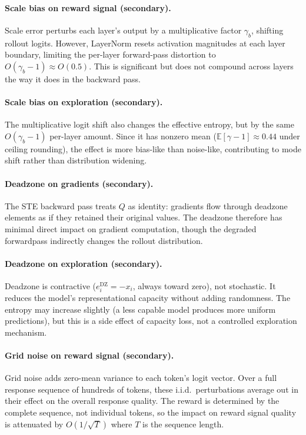 \documentclass{article}
\theoremstyle{definition}
\theoremstyle{remark}
\newcommand{\Expect}{\mathbb{E}}
\begin{document}
\paragraph{Scale bias on reward signal (secondary).}
Scale error perturbs each layer's output by a multiplicative factor $\gamma_b$, shifting rollout logits. However, LayerNorm resets activation magnitudes at each layer boundary, limiting the per-layer forward-pass distortion to $O(\gamma_b {-} 1) \approx O(0.5)$. This is significant but does not compound across layers the way it does in the backward pass.

\paragraph{Scale bias on exploration (secondary).}
The multiplicative logit shift also changes the effective entropy, but by the same $O(\gamma_b{-}1)$ per-layer amount. Since it has nonzero mean ($\Expect[\gamma{-}1] \approx 0.44$ under ceiling rounding), the effect is more bias-like than noise-like, contributing to mode shift rather than distribution widening.

\paragraph{Deadzone on gradients (secondary).}
The STE backward pass treats $Q$ as identity: gradients flow through deadzone elements as if they retained their original values. The deadzone therefore has minimal direct impact on gradient computation, though the degraded forwardpass indirectly changes the rollout distribution.

\paragraph{Deadzone on exploration (secondary).}
Deadzone is contractive ($e_i^{\mathrm{DZ}} = -x_i$, always toward zero), not stochastic. It reduces the model's representational capacity without adding randomness. The entropy may increase slightly (a less capable model produces more uniform predictions), but this is a side effect of capacity loss, not a controlled exploration mechanism.

\paragraph{Grid noise on reward signal (secondary).}
Grid noise adds zero-mean variance to each token's logit vector. Over a full response sequence of hundreds of tokens, these i.i.d.\ perturbations average out in their effect on the overall response quality. The reward is determined by the complete sequence, not individual tokens, so the impact on reward signal quality is attenuated by $O(1/\sqrt{T})$ where $T$ is the sequence length.
\end{document}
